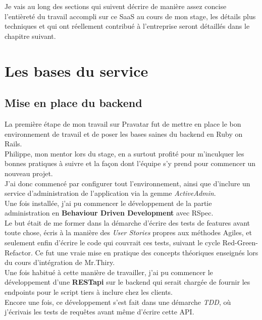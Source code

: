 \documentclass{report}
\begin{document}
  Je vais au long des sections qui suivent décrire de manière assez concise l'entièreté du travail accompli sur ce SaaS au cours de mon stage, les détails plus techniques et qui ont réellement contribué
  à l'entreprise seront détaillés dans le chapitre suivant.\\

  \section{Les bases du service}
  \label{sec:Les bases du service}

    \subsection{Mise en place du backend}
    \label{subs:Mise en place du backend}

      La première étape de mon travail sur Pravatar fut de mettre en place le bon environnement de travail et de poser les bases saines du backend en Ruby on Rails.\\
      Philippe, mon mentor lors du stage, en a surtout profité pour m'inculquer les bonnes pratiques à suivre et la façon dont l'équipe s'y prend pour commencer un nouveau projet.\\

      J'ai donc commencé par configurer tout l'environnement, ainsi que d'inclure un service d'administration de l'application via la gemme \textit{ActiveAdmin}.\\
      Une fois installée, j'ai pu commencer le développement de la partie administration en \textbf{Behaviour Driven Development} avec RSpec.\\

      Le but était de me former dans la démarche d'écrire des tests de features avant toute chose, écris à la manière des \textit{User Stories} propres aux méthodes Agiles, et seulement enfin
      d'écrire le code qui couvrait ces tests, suivant le cycle Red-Green-Refactor. Ce fut une vraie mise en pratique des concepts théoriques enseignés lors du cours d'intégration de Mr.Thiry.\\

      Une fois habitué à cette manière de travailler, j'ai pu commencer le développement d'une \textbf{RESTapi} sur le backend qui serait chargée de fournir les endpoints pour le script tiers
      à inclure chez les clients.\\
      Encore une fois, ce développement s'est fait dans une démarche \textit{TDD}, où j'écrivais les tests de requêtes avant même d'écrire cette API.\\
\end{document}
